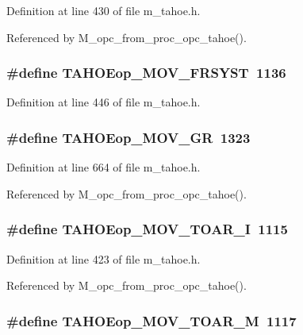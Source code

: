 Definition at line 430 of file m\_\-tahoe.h.

Referenced by M\_\-opc\_\-from\_\-proc\_\-opc\_\-tahoe().
\subsubsection{\setlength{\rightskip}{0pt plus 5cm}\#define TAHOEop\_\-MOV\_\-FRSYST~1136}\label{m__tahoe_8h_ec2bfc7fd2c9ada23ad3abb25f284d38}




Definition at line 446 of file m\_\-tahoe.h.
\subsubsection{\setlength{\rightskip}{0pt plus 5cm}\#define TAHOEop\_\-MOV\_\-GR~1323}\label{m__tahoe_8h_be66d7452a05ece49e718a346d7ac1be}




Definition at line 664 of file m\_\-tahoe.h.

Referenced by M\_\-opc\_\-from\_\-proc\_\-opc\_\-tahoe().
\subsubsection{\setlength{\rightskip}{0pt plus 5cm}\#define TAHOEop\_\-MOV\_\-TOAR\_\-I~1115}\label{m__tahoe_8h_21360b5aa8c78cd077406fbf3daa5259}




Definition at line 423 of file m\_\-tahoe.h.

Referenced by M\_\-opc\_\-from\_\-proc\_\-opc\_\-tahoe().
\subsubsection{\setlength{\rightskip}{0pt plus 5cm}\#define TAHOEop\_\-MOV\_\-TOAR\_\-M~1117}\label{m__tahoe_8h_373d65ae682c20b86dba0222e15a09b9}




